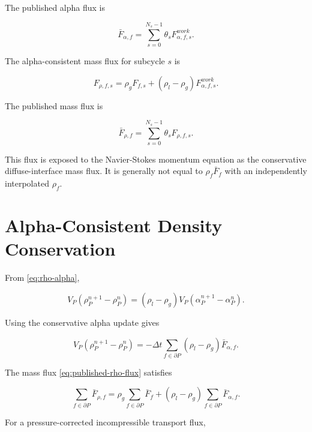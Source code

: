 \documentclass[11pt]{article}
\begin{document}
The published alpha flux is

\begin{equation}
  \bar{F}_{\alpha,f}
  =
  \sum_{s=0}^{N_s-1}
  \theta_s F_{\alpha,f,s}^{work}.
  \label{eq:published-alpha-flux}
\end{equation}

The alpha-consistent mass flux for subcycle \(s\) is

\begin{equation}
  F_{\rho,f,s}
  =
  \rho_g F_{f,s}
  +
  (\rho_l-\rho_g)
  F_{\alpha,f,s}^{work}.
  \label{eq:rho-flux-subcycle}
\end{equation}

The published mass flux is

\begin{equation}
  \bar{F}_{\rho,f}
  =
  \sum_{s=0}^{N_s-1}
  \theta_s F_{\rho,f,s}.
  \label{eq:published-rho-flux}
\end{equation}

This flux is exposed to the Navier-Stokes momentum equation as the conservative
diffuse-interface mass flux.  It is generally not equal to
\(\rho_f\bar{F}_f\) with an independently interpolated \(\rho_f\).

\section{Alpha-Consistent Density Conservation}

From \eqref{eq:rho-alpha},

\begin{equation}
  V_P(\rho_P^{n+1}-\rho_P^n)
  =
  (\rho_l-\rho_g)
  V_P(\alpha_P^{n+1}-\alpha_P^n).
\end{equation}

Using the conservative alpha update gives

\begin{equation}
  V_P(\rho_P^{n+1}-\rho_P^n)
  =
  -\Delta t
  \sum_{f\in\partial P}
  (\rho_l-\rho_g)\bar{F}_{\alpha,f}.
\end{equation}

The mass flux \eqref{eq:published-rho-flux} satisfies

\begin{equation}
  \sum_{f\in\partial P}\bar{F}_{\rho,f}
  =
  \rho_g
  \sum_{f\in\partial P}\bar{F}_f
  +
  (\rho_l-\rho_g)
  \sum_{f\in\partial P}\bar{F}_{\alpha,f}.
\end{equation}

For a pressure-corrected incompressible transport flux,
\end{document}
